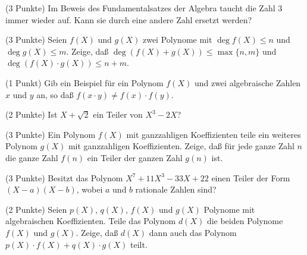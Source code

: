 \documentclass{algsheet}
\begin{document}
\begin{exercise}(3 Punkte)\newline
    Im Beweis des Fundamentalsatzes der Algebra taucht die Zahl \(3\)
    immer wieder auf. Kann sie durch eine andere Zahl ersetzt werden?
\end{exercise}





\begin{exercise}(3 Punkte)\newline
    Seien \(f(X)\) und \(g(X)\) zwei Polynome mit \(\deg f(X) \leq n\) und
    \(\deg g(X) \leq m\). Zeige, daß \(\deg (f(X) + g(X)) \leq \max\{n, m\}\)
    und \(\deg (f(X) \cdot g(X)) \leq n + m\).
\end{exercise}

\begin{exercise}(1 Punkt)\newline
    Gib ein Beispiel für ein Polynom \(f(X)\) und zwei algebraische Zahlen
    \(x\) und \(y\) an, so daß \(f(x \cdot y) \neq f(x) \cdot f(y)\).
\end{exercise}

\begin{exercise}(2 Punkte)\newline
    Ist \(X + \sqrt 2\) ein Teiler von \(X^3 - 2 X\)?
\end{exercise}

\begin{exercise}(3 Punkte)\newline
    Ein Polynom \(f(X)\) mit ganzzahligen Koeffizienten teile ein weiteres
    Polynom \(g(X)\) mit ganzzahligen Koeffizienten. Zeige, daß für jede ganze
    Zahl \(n\) die ganze Zahl \(f(n)\) ein Teiler der ganzen Zahl \(g(n)\) ist.
\end{exercise}

\begin{exercise}(3 Punkte)\newline
    Besitzt das Polynom \(X^7 + 11 X^3 - 33 X + 22\) einen Teiler der Form
    \((X - a) (X - b)\), wobei \(a\) und \(b\) rationale Zahlen sind?
\end{exercise}

\begin{exercise}(2 Punkte)\newline
    Seien \(p(X)\), \(q(X)\), \(f(X)\) und \(g(X)\) Polynome mit algebraischen
    Koeffizienten. Teile das Polynom \(d(X)\) die beiden Polynome \(f(X)\) und
    \(g(X)\). Zeige, daß \(d(X)\) dann auch das Polynom \(p(X) \cdot f(X)
    + q(X) \cdot g(X)\) teilt.
\end{exercise}
\end{document}
